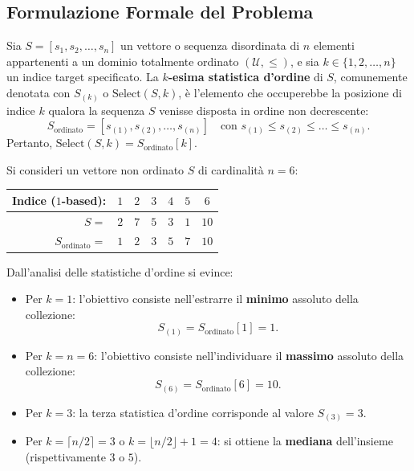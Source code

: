 \subsection{Formulazione Formale del Problema}
\label{subsec:selection-formulation}

\begin{definition}
Sia $S = [s_1, s_2, \dots, s_n]$ un vettore o sequenza disordinata di $n$ elementi appartenenti a un dominio totalmente ordinato $(\mathcal{U}, \le)$, e sia $k \in \{1, 2, \dots, n\}$ un indice target specificato. La \textbf{$k$-esima statistica d'ordine} di $S$, comunemente denotata con $S_{(k)}$ o $\text{Select}(S, k)$, è l'elemento che occuperebbe la posizione di indice $k$ qualora la sequenza $S$ venisse disposta in ordine non decrescente:
\begin{equation}
  S_{\text{ordinato}} = [s_{(1)}, s_{(2)}, \dots, s_{(n)}] \quad \text{con } s_{(1)} \le s_{(2)} \le \dots \le s_{(n)}.
\end{equation}
Pertanto, $\text{Select}(S, k) = S_{\text{ordinato}}[k]$.
\end{definition}

\begin{example}
Si consideri un vettore non ordinato $S$ di cardinalità $n = 6$:
\begin{center}
\begin{tabular}{rcccccc}
\toprule
\textbf{Indice ($1$-based):} & $1$ & $2$ & $3$ & $4$ & $5$ & $6$ \\
\midrule
$S =$ & $2$ & $7$ & $5$ & $3$ & $1$ & $10$ \\
$S_{\text{ordinato}} =$ & $1$ & $2$ & $3$ & $5$ & $7$ & $10$ \\
\bottomrule
\end{tabular}
\end{center}
Dall'analisi delle statistiche d'ordine si evince:
\begin{itemize}
  \item Per $k = 1$: l'obiettivo consiste nell'estrarre il \textbf{minimo} assoluto della collezione:
  \begin{equation}
    S_{(1)} = S_{\text{ordinato}}[1] = 1.
  \end{equation}
  \item Per $k = n = 6$: l'obiettivo consiste nell'individuare il \textbf{massimo} assoluto della collezione:
  \begin{equation}
    S_{(6)} = S_{\text{ordinato}}[6] = 10.
  \end{equation}
  \item Per $k = 3$: la terza statistica d'ordine corrisponde al valore $S_{(3)} = 3$.
  \item Per $k = \lceil n/2 \rceil = 3$ o $k = \lfloor n/2 \rfloor + 1 = 4$: si ottiene la \textbf{mediana} dell'insieme (rispettivamente $3$ o $5$).
\end{itemize}
\end{example}

